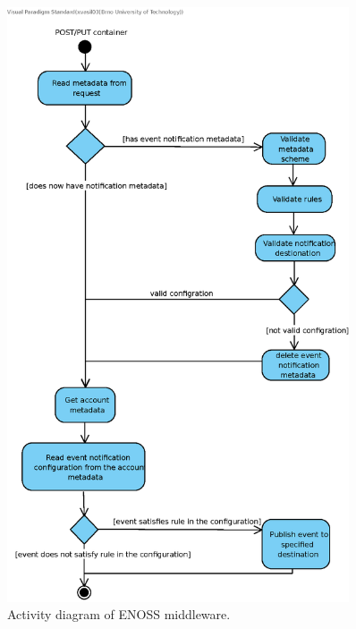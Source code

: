     \begin{figure}[H]
        \centering
        \includegraphics[width=0.9\textwidth]{obrazky-figures/middleware-activity-diagram.eps}
        \caption{Activity diagram of ENOSS middleware.}
        \label{fig:middlewareActivity}
    \end{figure}

